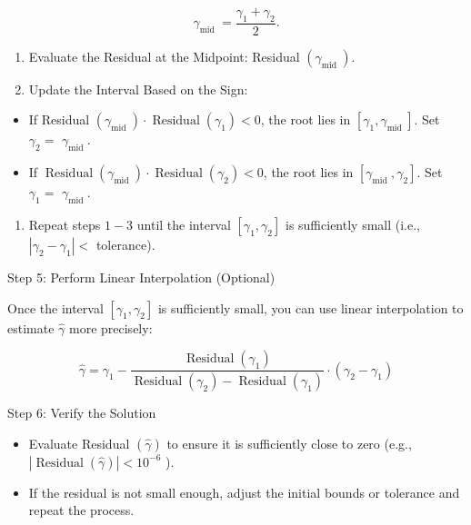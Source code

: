 \documentclass[
  12 pt,
  a4paper,
]{book}
\providecommand{\tightlist}{%
  \setlength{\itemsep}{0pt}\setlength{\parskip}{0pt}}
\numberwithin{equation}{section}
\theoremstyle{plain}      %
\theoremstyle{definition} %
\theoremstyle{remark}     %
\theoremstyle{note}         %
\begin{document}
\[
\gamma_{\text {mid }}=\frac{\gamma_1+\gamma_2}{2} .
\]

\begin{enumerate}
\def\labelenumi{\arabic{enumi}.}
\setcounter{enumi}{1}
\item
  Evaluate the Residual at the Midpoint: Residual
  \(\left(\gamma_{\text {mid }}\right)\).
\item
  Update the Interval Based on the Sign:
\end{enumerate}

\begin{itemize}
\tightlist
\item
  If Residual
  \(\left(\gamma_{\text {mid }}\right) \cdot \operatorname{Residual}\left(\gamma_1\right)<0\),
  the root lies in \(\left[\gamma_1, \gamma_{\text {mid }}\right]\). Set
  \(\gamma_2=\) \(\gamma_{\text {mid }}\).
\item
  If
  \(\operatorname{Residual}\left(\gamma_{\text {mid }}\right) \cdot \operatorname{Residual}\left(\gamma_2\right)<0\),
  the root lies in \(\left[\gamma_{\text {mid }}, \gamma_2\right]\). Set
  \(\gamma_1=\) \(\gamma_{\text {mid }}\).
\end{itemize}

\begin{enumerate}
\def\labelenumi{\arabic{enumi}.}
\setcounter{enumi}{3}
\tightlist
\item
  Repeat steps \(1-3\) until the interval
  \(\left[\gamma_1, \gamma_2\right]\) is sufficiently small (i.e.,
  \(\left|\gamma_2-\gamma_1\right|<\) tolerance).
\end{enumerate}

Step 5: Perform Linear Interpolation (Optional)

Once the interval \(\left[\gamma_1, \gamma_2\right]\) is sufficiently
small, you can use linear interpolation to estimate \(\hat{\gamma}\)
more precisely:

\[
\hat{\gamma}=\gamma_1-\frac{\operatorname{Residual}\left(\gamma_1\right)}{\operatorname{Residual}\left(\gamma_2\right)-\operatorname{Residual}\left(\gamma_1\right)} \cdot\left(\gamma_2-\gamma_1\right)
\]

Step 6: Verify the Solution

\begin{itemize}
\tightlist
\item
  Evaluate Residual \((\hat{\gamma})\) to ensure it is sufficiently
  close to zero (e.g.,
  \(|\operatorname{Residual}(\hat{\gamma})|<10^{-6}\) ).
\item
  If the residual is not small enough, adjust the initial bounds or
  tolerance and repeat the process.
\end{itemize}
\end{document}

